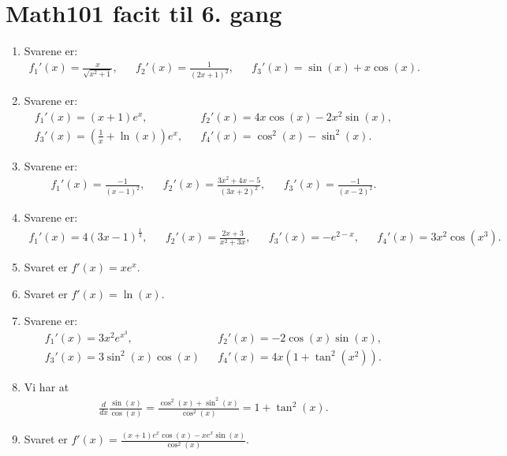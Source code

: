 \newpage
\section{Math101 facit til 6. gang}
\begin{enumerate}

	\item Svarene er:
	\begin{align*}
	f_1'(x)=\frac{x}{\sqrt{x^2+1}},&& f_2'(x)=\frac{1}{(2x+1)^2},&& f_3'(x)=\sin(x)+x\cos(x).
	\end{align*}

	\item Svarene er:
	\begin{align*}
	f_1'(x)=(x+1)e^x,&& f_2'(x)=4x\cos(x)-2x^2\sin(x),\\ f_3'(x)=(\frac{1}{x}+\ln(x))e^x,&& f_4'(x)=\cos^2(x)-\sin^2(x).
	\end{align*}

	\item Svarene er:
	\begin{align*}
	f_1'(x)=\frac{-1}{(x-1)^2},&&f_2'(x)=\frac{3x^2+4x-5}{(3x+2)^2},&&f_3'(x)=\frac{-1}{(x-2)^2}.
	\end{align*}
	
	\item Svarene er:
	\begin{align*}
	f_1'(x)=4(3x-1)^\frac{1}{3},&& f_2'(x)=\frac{2x+3}{x^2+3x},&& f_3'(x)=-e^{2-x},&&f_4'(x)=3x^2\cos(x^3).
	\end{align*}
	
	\item \label{it:diff24} Svaret er $f'(x)=xe^x$.
	
	
	\item \label{it:diff23} Svaret er $f'(x)=\ln(x)$.
	
	\item Svarene er:
	\begin{align*}
	f_1'(x)=3x^2e^{x^3},&&f_2'(x)=-2\cos(x)\sin(x),\\f_3'(x)=3\sin^2(x)\cos(x)&&f_4'(x)=4x(1+\tan^2(x^2)).
	\end{align*}
		
	\item\label{it:diff21} Vi har at 
	\begin{align*}
	\frac{d}{dx} \frac{\sin(x)}{\cos(x)}=\frac{\cos^2(x)+\sin^2(x)}{\cos^2(x)}=1+\tan^2(x).
	\end{align*}

	\item Svaret er $f'(x)=\frac{(x+1)e^x\cos(x)-xe^x\sin(x)}{\cos^2(x)}$.
		

\end{enumerate}
